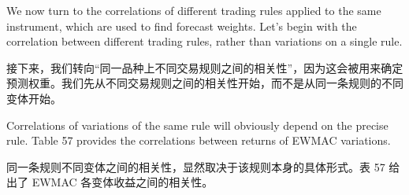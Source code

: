 \bipairgap

\begin{englishblock} We now turn to the correlations of different trading rules applied to the same instrument, which are used to find forecast weights. Let’s begin with the correlation between different trading rules, rather than variations on a single rule. \end{englishblock}

\begin{chineseblock}接下来，我们转向“同一品种上不同交易规则之间的相关性”，因为这会被用来确定预测权重。我们先从不同交易规则之间的相关性开始，而不是从同一条规则的不同变体开始。\end{chineseblock}

\begin{bilingualtableblock} 
\end{bilingualtableblock}

\begin{englishblock} Correlations of variations of the same rule will obviously depend on the precise rule. Table 57 provides the correlations between returns of EWMAC variations. \end{englishblock}

\begin{chineseblock}同一条规则不同变体之间的相关性，显然取决于该规则本身的具体形式。表 57 给出了 EWMAC 各变体收益之间的相关性。\end{chineseblock}

